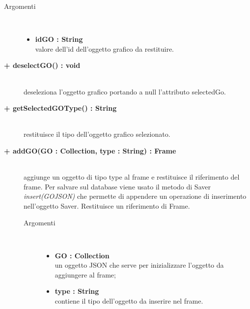 \begin{description}
\begin{description}
\begin{description}
\begin{description}
			\item[Argomenti] \hfill \\
				\begin{itemize}
						\item \textbf{idGO : String			} \hfill \\
					valore dell'id dell'oggetto grafico da restituire.  				
				\end{itemize}

\end{description}

\end{description}

\begin{description}
		\item[\textbf{\color{blue}+ deselectGO() : void			}] \hfill \\
			deseleziona l'oggetto grafico portando a null l'attributo selectedGo. 
\end{description}

\begin{description}
		\item[\textbf{\color{blue}+ getSelectedGOType() : String			}] \hfill \\
			restituisce il tipo dell'oggetto grafico selezionato.
\end{description}

\begin{description}
		\item[\textbf{\color{blue}+ addGO(GO : Collection, type : String) : Frame			}] \hfill \\
			aggiunge un oggetto di tipo type al frame e restituisce il riferimento del frame. Per  salvare sul database viene usato il metodo di Saver \textit{insert(GOJSON)} che permette di appendere un operazione di inserimento nell'oggetto Saver. Restituisce un riferimento di Frame.  

\begin{description}
			\item[Argomenti] \hfill \\
				\begin{itemize}
						\item \textbf{GO : Collection			} \hfill \\
					un oggetto JSON che serve per inizializzare l'oggetto da aggiungere al frame;
					  	\item \textbf{type : String			} \hfill \\
					  	contiene il tipo dell'oggetto da inserire nel frame.
				\end{itemize}


\end{description}
\end{description}
\end{description}
\end{description}
